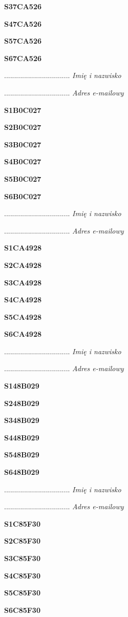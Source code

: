 \Large \textbf{S37CA526}

\Large \textbf{S47CA526}

\Large \textbf{S57CA526}

\Large \textbf{S67CA526}

.................................
\textit{Imię i nazwisko}

.................................
\textit{Adres e-mailowy}

\Large \textbf{S1B0C027}

\Large \textbf{S2B0C027}

\Large \textbf{S3B0C027}

\Large \textbf{S4B0C027}

\Large \textbf{S5B0C027}

\Large \textbf{S6B0C027}

.................................
\textit{Imię i nazwisko}

.................................
\textit{Adres e-mailowy}

\Large \textbf{S1CA4928}

\Large \textbf{S2CA4928}

\Large \textbf{S3CA4928}

\Large \textbf{S4CA4928}

\Large \textbf{S5CA4928}

\Large \textbf{S6CA4928}

.................................
\textit{Imię i nazwisko}

.................................
\textit{Adres e-mailowy}

\Large \textbf{S148B029}

\Large \textbf{S248B029}

\Large \textbf{S348B029}

\Large \textbf{S448B029}

\Large \textbf{S548B029}

\Large \textbf{S648B029}

.................................
\textit{Imię i nazwisko}

.................................
\textit{Adres e-mailowy}

\Large \textbf{S1C85F30}

\Large \textbf{S2C85F30}

\Large \textbf{S3C85F30}

\Large \textbf{S4C85F30}

\Large \textbf{S5C85F30}

\Large \textbf{S6C85F30}

